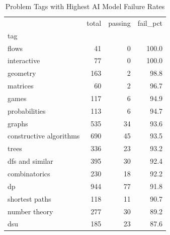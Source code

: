 \begin{table}[htbp]
\caption{Problem Tags with Highest AI Model Failure Rates}
\label{tab:ai_failure_tag}
\begin{tabular}{lrrr}
\toprule
 & total & passing & fail\_pct \\
tag &  &  &  \\
\midrule
flows & 41 & 0 & 100.0 \\
interactive & 77 & 0 & 100.0 \\
geometry & 163 & 2 & 98.8 \\
matrices & 60 & 2 & 96.7 \\
games & 117 & 6 & 94.9 \\
probabilities & 113 & 6 & 94.7 \\
graphs & 535 & 34 & 93.6 \\
constructive algorithms & 690 & 45 & 93.5 \\
trees & 336 & 23 & 93.2 \\
dfs and similar & 395 & 30 & 92.4 \\
combinatorics & 230 & 18 & 92.2 \\
dp & 944 & 77 & 91.8 \\
shortest paths & 118 & 11 & 90.7 \\
number theory & 277 & 30 & 89.2 \\
dsu & 185 & 23 & 87.6 \\
\bottomrule
\end{tabular}
\end{table}
